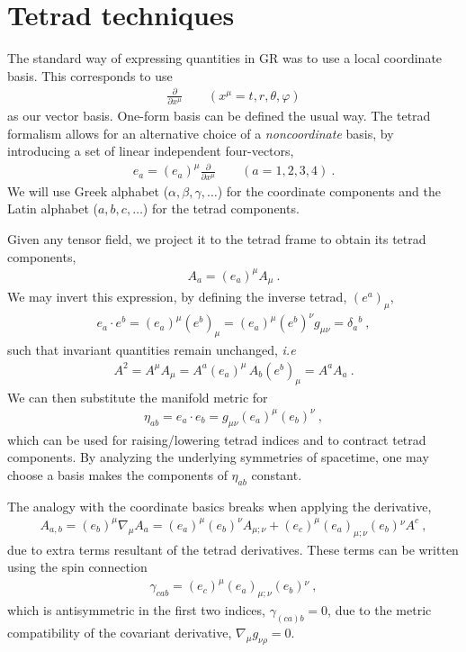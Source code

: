 
\chapter{Tetrad techniques} %
\label{AppendixTetrad}

The standard way of expressing quantities in GR was to use a local coordinate basis. This corresponds to use
\begin{align}
   \frac{\partial}{\partial x^\mu} \qquad ( x^\mu = t,r,\theta,\varphi )
\end{align}
as our vector basis. One-form basis can be defined the usual way. The tetrad formalism allows for an alternative choice of a \emph{noncoordinate} basis, by introducing a set of linear independent four-vectors, 
\begin{align}
    e_a = (e_a)^\mu \frac{\partial}{\partial x^\mu} \qquad ( a = 1,2,3,4 ) ~.
 \end{align}
We will use Greek alphabet ($\alpha,\beta,\gamma,\dots$) for the coordinate components and the Latin alphabet ($a,b,c,\dots$) for the tetrad components.

Given any tensor field, we project it to the tetrad frame to obtain its tetrad components,
\begin{align}
    A_{a} = (e_a)^\mu A_{\mu} ~.
\end{align}
We may invert this expression, by defining the inverse tetrad, $(e^a)_\mu$,
\begin{align}
    e_a \cdot e^b = (e_a)^\mu (e^b)_\mu = (e_a)^\mu (e^b)^\nu g_{\mu\nu} = \delta_a{}^b ~,
\end{align}
such that invariant quantities remain unchanged, \emph{i.e}
\begin{align}
    A^2 = A^\mu A_\mu = A^a (e_a)^\mu \, A_b (e^b)_\mu = A^a A_a~.
\end{align}
We can then substitute the manifold metric for
\begin{align}
    \eta_{ab} = e_a \cdot e_b = g_{\mu\nu} (e_a)^\mu (e_b)^\nu ~,
\end{align}
which can be used for raising/lowering tetrad indices and to contract tetrad components.
By analyzing the underlying symmetries of spacetime, one may choose a basis makes the components of $\eta_{ab}$ constant.

The analogy with the coordinate basics breaks when applying the derivative, 
\begin{align}
    A_{a,b} = (e_b)^\mu \nabla_\mu A_{a} = (e_a)^\mu (e_b)^\nu A_{\mu ; \nu} + (e_c)^\mu (e_a)_{\mu;\nu} (e_b){}^\nu A^c ~,
\end{align}
due to extra terms resultant of the tetrad derivatives. These terms can be written using the spin connection
\begin{align}
    \gamma_{cab} = (e_c)^\mu (e_a)_{\mu;\nu} (e_b){}^\nu ~,
\end{align}  
which is antisymmetric in the first two indices, $\gamma_{(ca)b}=0$, due to the metric compatibility of the covariant derivative, $\nabla_\mu g_{\nu\rho} = 0$. 